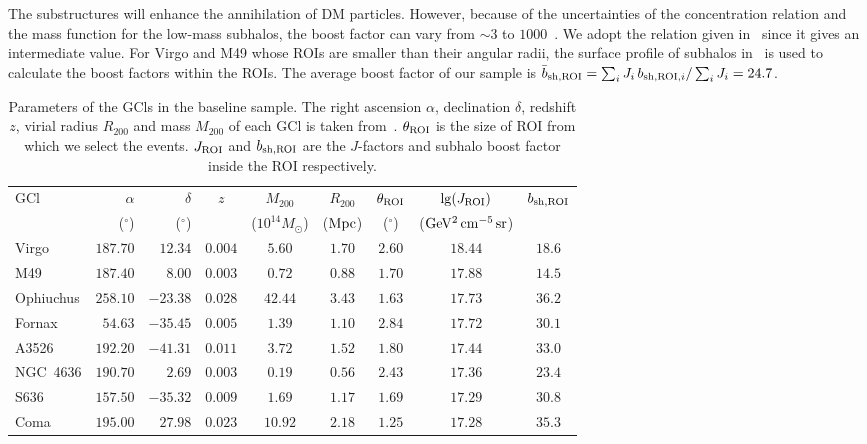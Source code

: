 \documentclass[
	twocolumn,
]{aastex6} %
\renewcommand{\deg}{\ensuremath{^{\circ}}\xspace}
\begin{document}
The substructures will enhance the annihilation of DM particles.
However, because of the uncertainties of the concentration relation and the mass function for the low-mass subhalos, the boost factor can vary from $\sim 3$ to $1000$~\citep{Gao2012,SanchezConde2014,Bartels2015,Ando2019}.
We adopt the relation given in~\citet{SanchezConde2014} since it gives an intermediate value.
For Virgo and M49 whose ROIs are smaller than their angular radii, the surface profile of subhalos in~\citet{Gao2012} is used to calculate the boost factors within the ROIs.
The average boost factor of our sample is $\bar{b}_{\rm sh,ROI}=\sum_i J_i\, b_{{\rm sh,ROI},i}/\sum_i J_i=24.7$.

\begin{table*}
	\centering
	\caption{\label{tab:HIFLUGCS_GCls}
	Parameters of the GCls in the baseline sample.
	The right ascension $\alpha$, declination $\delta$, redshift $z$, virial radius $R_{200}$ and mass $M_{200}$ of each GCl is taken from~\citet{Anderson2016}.
	$\theta_{\rm ROI}$ is the size of ROI from which we select the events.
	$J_{\rm ROI}$ and $b_{\rm sh,ROI}$ are the $J$-factors and subhalo boost factor inside the ROI respectively.
	}
	\begin{tabular}{lrrcccccc}
		\hline\hline
		GCl & $\alpha$ & $\delta$ &  $z$  &     $M_{200}$      & $R_{200}$ & $\theta_{\rm ROI}$ &  $\lg (J_{\rm ROI})$   &$b_{\rm sh,ROI}$ \\
		    & ($\deg$) & ($\deg$) &       & ($10^{14}M_\odot$) &($\rm Mpc$)&       ($\deg$)     & ($\rm GeV^2\,cm^{-5}\,sr$) &              \\
		\hline
		Virgo    &$ 187.70 $&$ 12.34 $&$0.004$&$ 5.60 $&$ 1.70 $&$ 2.60 $&$ 18.44 $&$ 18.6 $\\
		M49      &$ 187.40 $&$  8.00 $&$0.003$&$ 0.72 $&$ 0.88 $&$ 1.70 $&$ 17.88 $&$ 14.5 $\\
		Ophiuchus&$ 258.10 $&$-23.38 $&$0.028$&$42.44 $&$ 3.43 $&$ 1.63 $&$ 17.73 $&$ 36.2 $\\
		Fornax   &$  54.63 $&$-35.45 $&$0.005$&$ 1.39 $&$ 1.10 $&$ 2.84 $&$ 17.72 $&$ 30.1 $\\
		A3526    &$ 192.20 $&$-41.31 $&$0.011$&$ 3.72 $&$ 1.52 $&$ 1.80 $&$ 17.44 $&$ 33.0 $\\
		NGC~4636 &$ 190.70 $&$  2.69 $&$0.003$&$ 0.19 $&$ 0.56 $&$ 2.43 $&$ 17.36 $&$ 23.4 $\\
		S636     &$ 157.50 $&$-35.32 $&$0.009$&$ 1.69 $&$ 1.17 $&$ 1.69 $&$ 17.29 $&$ 30.8 $\\
		Coma     &$ 195.00 $&$ 27.98 $&$0.023$&$10.92 $&$ 2.18 $&$ 1.25 $&$ 17.28 $&$ 35.3 $\\

\end{tabular}
\end{table*}
\end{document}
